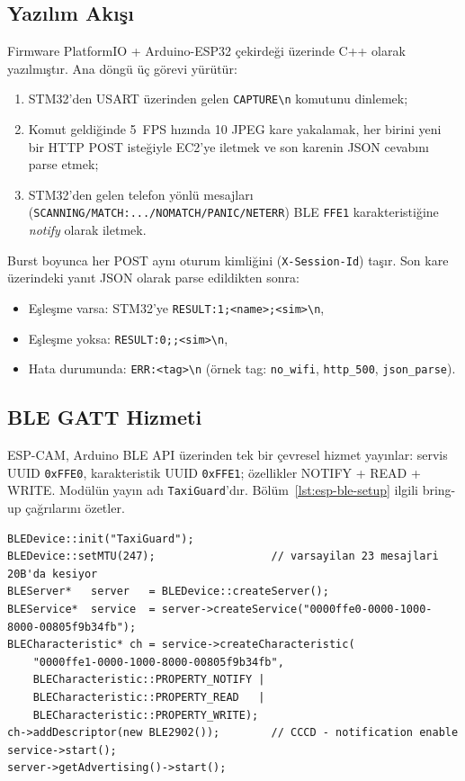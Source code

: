 \subsection{Yazılım Akışı}

Firmware PlatformIO + Arduino-ESP32 çekirdeği üzerinde C++ olarak
yazılmıştır. Ana döngü üç görevi yürütür:

\begin{enumerate}
    \item STM32'den USART üzerinden gelen \texttt{CAPTURE\textbackslash n}
          komutunu dinlemek;
    \item Komut geldiğinde 5~FPS hızında 10 JPEG kare yakalamak, her
          birini yeni bir HTTP POST isteğiyle EC2'ye iletmek ve son
          karenin JSON cevabını parse etmek;
    \item STM32'den gelen telefon yönlü mesajları
          (\texttt{SCANNING/MATCH:.../NOMATCH/PANIC/NETERR}) BLE
          \texttt{FFE1} karakteristiğine \emph{notify} olarak iletmek.
\end{enumerate}

Burst boyunca her POST aynı oturum kimliğini (\texttt{X-Session-Id})
taşır. Son kare üzerindeki yanıt JSON olarak parse edildikten sonra:

\begin{itemize}
    \item Eşleşme varsa: STM32'ye \texttt{RESULT:1;<name>;<sim>\textbackslash n},
    \item Eşleşme yoksa: \texttt{RESULT:0;;<sim>\textbackslash n},
    \item Hata durumunda: \texttt{ERR:<tag>\textbackslash n} (örnek tag:
          \texttt{no\_wifi}, \texttt{http\_500}, \texttt{json\_parse}).
\end{itemize}

\subsection{BLE GATT Hizmeti}

ESP-CAM, Arduino BLE API üzerinden tek bir çevresel hizmet yayınlar:
servis UUID \texttt{0xFFE0}, karakteristik UUID \texttt{0xFFE1}; özellikler
NOTIFY + READ + WRITE. Modülün yayın adı \texttt{TaxiGuard}'dır.
Bölüm~\ref{lst:esp-ble-setup} ilgili bring-up çağrılarını özetler.

\begin{lstlisting}[language=none, caption={ESP32-CAM tarafında BLE çevresel hizmetin kurulumu (özet).}, label=lst:esp-ble-setup]
BLEDevice::init("TaxiGuard");
BLEDevice::setMTU(247);                  // varsayilan 23 mesajlari 20B'da kesiyor
BLEServer*   server   = BLEDevice::createServer();
BLEService*  service  = server->createService("0000ffe0-0000-1000-8000-00805f9b34fb");
BLECharacteristic* ch = service->createCharacteristic(
    "0000ffe1-0000-1000-8000-00805f9b34fb",
    BLECharacteristic::PROPERTY_NOTIFY |
    BLECharacteristic::PROPERTY_READ   |
    BLECharacteristic::PROPERTY_WRITE);
ch->addDescriptor(new BLE2902());        // CCCD - notification enable
service->start();
server->getAdvertising()->start();
\end{lstlisting}

